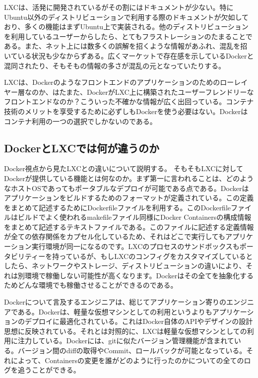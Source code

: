 \documentclass[9pt,b5paper,tombo]{jsbook}
\begin{document}
LXCは、活発に開発されているがその割にはドキュメントが少ない。特にUbuntu以外のディストリビューションで利用する際のドキュメントが欠如しており、多くの機能はまずUbuntu上で実装される。他のディストリビューションを利用しているユーザーからしたら、とてもフラストレーションのたまることである。また、ネット上には数多くの誤解を招くような情報があふれ、混乱を招いている状況も少なからずある。広くマーケットで存在感を示しているDockerと混同されたり、そもそもの情報の多さが混乱の元となっていたりする。

LXCは、Dockerのようなフロントエンドのアプリケーションのためのローレイヤー層なのか、はたまた、DockerがLXC上に構築されたユーザーフレンドリーなフロントエンドなのか？こういった不確かな情報が広く出回っている。コンテナ技術のメリットを享受するために必ずしもDockerを使う必要はない。Dockerはコンテナ利用の一つの選択でしかないのである。

\subsection{DockerとLXCでは何が違うのか}
Docker視点から見たLXCとの違いについて説明する。
そもそもLXCに対してDockerが提供している機能とは何なのか。まず第一に言われることは、どのようなホストOSであってもポータブルなデプロイが可能である点である。Dockerはアプリケーションをビルドするためのフォーマットが定義されている。この定義をまとめて記述するためにDockerfileファイルを利用する。このDockerfileファイルはビルドでよく使われるmakefileファイル同様にDocker Containersの構成情報をまとめて記述するテキストファイルである。このファイルに記述する定義情報が全ての依存関係をカプセル化しているため、それはどこで実行してもアプリケーション実行環境が同一になるのです。LXCのプロセスのサンドボックスもポータビリティーを持っているが、もしLXCのコンフィグをカスタマイズしているとしたら、ネットワークやストレージ、ディストリビューションの違いにより、それは別環境で稼働しない可能性が高くなります。Dockerはその全てを抽象化するためどんな環境でも稼働させることができるのである。

Dockerについて言及するエンジニアは、総じてアプリケーション寄りのエンジニアである。Dockerは、軽量な仮想マシンとしての利用というよりもアプリケーションのデプロイに最適化されている。これはDocker自体のAPIやデザインの設計思想に反映されている。それとは対照的に、LXCは軽量な仮想マシンとしての利用に注力している。Dockerには、gitに似たバージョン管理機能が含まれている。バージョン間のdiffの取得やCommit、ロールバックが可能となっている。それによって、Containersの変更を誰がどのように行ったのかについての全てのログを追うことができる。
\end{document}
